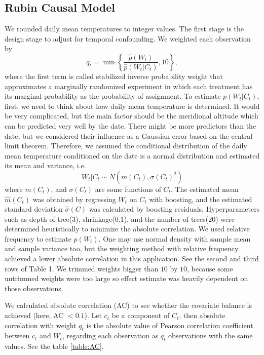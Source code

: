\documentclass[12pt]{article}
\begin{document}
\subsection{Rubin Causal Model}

We rounded daily mean temperatures to integer values.
The first stage is the design stage to adjust for temporal confounding.
We weighted each observation by 
\begin{equation}
	q_t = \min{ \left \{ \frac{\hat{p}(W_t)}{\hat{p}(W_t \lvert C_t)}, 10 \right \} },
	\label{eqn:sipw}
\end{equation}
where the first term is called stabilized inverse probability weight\cite{sipw2010}
that approximates a marginally randomized experiment
in which each treatment has its marginal probability as the probability of assignment.
To estimate $p(W_t \lvert C_t)$, 
first, we need to think about how daily mean temperature is determined.
It would be very complicated, 
but the main factor should be the meridional altitude
which can be predicted very well by the date.
There might be more predictors than the date,
but we considered their influence as a Gaussian error based on the central limit theorem.
Therefore, we assumed
the conditional distribution of the daily mean temperature conditioned on 
the date is a normal distribution 
and estimated its mean and variance, i.e.
\begin{equation}
	W_t\lvert C_t \sim N(m(C_t), \sigma(C_t)^2) 
	\label{eqn:gps}
\end{equation}
where $m(C_t)$, and $\sigma(C_t)$ are some functions of $C_t$.
The estimated mean $\hat{m}(C_t)$ was obtained by regressing $W_t$ on $C_t$ with boosting, 
and the estimated standard deviation $\hat{\sigma}(C)$ was calculated
by boosting residuals\cite{hirano2004, gpsboosting2015}.
Hyperparameters such as depth of tree($3$), shrinkage($0.1$), and the number of trees($20$) 
were determined heuristically to minimize the absolute correlation.
We used relative frequency to estimate $p(W_t)$.
One may use normal density with sample mean and sample variance too, but
the weighting method with relative frequency achieved a lower absolute correlation in this application.
See the second and third rows of Table 1.
We trimmed weights bigger than $10$ by $10$,
because some untrimmed weights were too large so
effect estimate was heavily dependent on those observations.

We calculated absolute correlation (AC)\cite{gpsboosting2015} 
to see whether the covariate balance is achieved (here, AC $<0.1$).
Let $c_t$ be a component of $C_t$, then absolute correlation with weight $q_t$ is
the absolute value of Pearson correlation coefficient between $c_t$ and $W_t$,
regarding each observation as $q_t$ observations with the same values.
See the table \ref{table:AC}.
\end{document}
